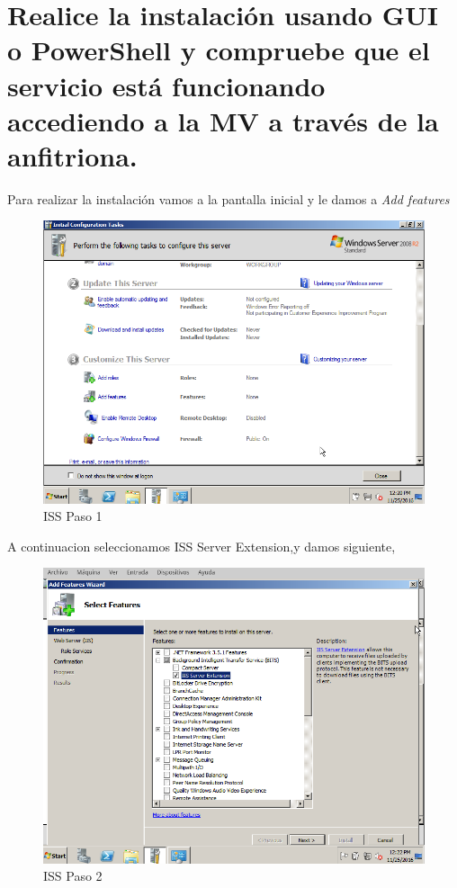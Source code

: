 \section[Cuestión 10]{ Realice la instalación usando GUI o PowerShell y compruebe	que el servicio está funcionando accediendo a la MV a través de la anfitriona. }

Para realizar la instalación vamos a la pantalla inicial y le damos a \textit{Add features} 

	\begin{figure}[H]
	\centering
	\includegraphics[scale=0.35]{pics/gui1.png} 
	\caption{ISS Paso 1} \label{fig:iss1}
	\end{figure}

A continuacion seleccionamos ISS Server Extension,y damos siguiente,

	\begin{figure}[H]
	\centering
	\includegraphics[scale=0.35]{pics/gui2.png} 
	\caption{ISS Paso 2} \label{fig:iss2}
	\end{figure}


